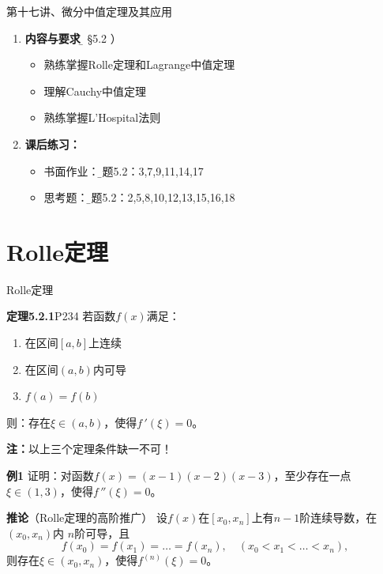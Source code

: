 \begin{frame}{第十七讲、微分中值定理及其应用}
	\linespread{1.5}
	\begin{enumerate}
	  \item {\bf 内容与要求}{\b（ \S 5.2 ）}
	  \begin{itemize}
	    \item 熟练掌握Rolle定理和Lagrange中值定理
	    \item 理解Cauchy中值定理
	    \item 熟练掌握L'Hospital法则
	  \vspace{1em}
	  \end{itemize}
	  \item {\bf 课后练习：}
	  \begin{itemize}
	    \item 书面作业：{\b 习题5.2：3,7,9,11,14,17}
 	    \item 思考题：{\b 习题5.2：2,5,8,10,12,13,15,16,18}
	  \end{itemize}
	\end{enumerate}
\end{frame}

\section{Rolle定理}

\begin{frame}{Rolle定理}
	\linespread{1.2}\pause 
	\begin{block}{{\bf 定理5.2.1}\hfill P234}
		若函数$f(x)$满足：\pause 
		\begin{enumerate}
		  \item 在区间$[a,b]$上连续\pause 
		  \item 在区间$(a,b)$内可导\pause 
		  \item $f(a)=f(b)$\pause 
		\end{enumerate}
		则：存在$\xi\in(a,b)$，使得$f\,'(\xi)=0$。
	\end{block}\pause 
	{\bf 注：}\alert{以上三个定理条件缺一不可！}
\end{frame}

\begin{frame}
	\linespread{1.2}
	\begin{exampleblock}{{\bf 例1}\hfill}
		证明：对函数$f(x)=(x-1)(x-2)(x-3)$，至少存在一点
		$\xi\in(1,3)$，使得$f\,''(\xi)=0$。
	\end{exampleblock}
	\bigskip
	\pause
	\begin{block}{{\bf 推论}（Rolle定理的高阶推广）\hfill}
		设$f(x)$在$[x_0,x_n]$上有$n-1$阶连续导数，在$(x_0,x_n)$内
		$n$阶可导，且
		$$f(x_0)=f(x_1)=\ldots=f(x_n),\quad(x_0<x_1<\ldots<x_n),$$
		则存在$\xi\in(x_0,x_n)$，使得$f^{(n)}(\xi)=0$。
	\end{block}
\end{frame}


